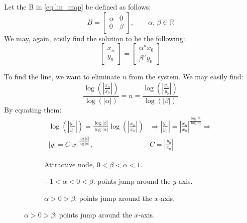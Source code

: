\begin{example}
    Let the B in \autoref{eq:lin_map} be defined as follows:
    \begin{equation*}
        B=\begin{bmatrix}
           \alpha & 0 \\ 0 & \beta 
        \end{bmatrix},\qquad \alpha,\,\beta\in\mathbb{R}
    \end{equation*}
    We may, again, easily find the solution to be the following: \begin{equation*}
        \begin{bmatrix}
            x_n \\ y_n
        \end{bmatrix}=\begin{bmatrix}
            \alpha^n x_0 \\ \beta^n y_0
        \end{bmatrix}
    \end{equation*}

    To find the line, we want to eliminate $n$ from the system. We may easily find: \begin{equation*}
        \frac{\log\left(\left|\frac{x_n}{x_0}\right|\right)}{\log(|\alpha|)}=n=\frac{\log\left(\left|\frac{y_n}{y_0}\right|\right)}{\log(|\beta|)}
    \end{equation*}
    By equating them: \begin{align*}
        \log\left(\left|\frac{y_n}{y_0}\right|\right)=\frac{\log|\beta|}{\log|\alpha|}\log\left(\left|\frac{x_n}{x_0}\right|\right)&\Rightarrow\left|\frac{y_n}{y_0}\right|=\left|\frac{x_n}{x_0}\right|^{\frac{\log|\beta|}{\log|\alpha|}}\Rightarrow \\
        |y|=C|x|^{\frac{\log|\beta|}{\log|\alpha|}},\qquad& C=\left|\frac{y_0}{x_0}\right|
    \end{align*}

    \begin{figure}[ht]
    \centering
    \begin{subfigure}[t]{0.32\textwidth}
        \centering
        \caption{Attractive node, $0<\beta<\alpha<1$.}
    \end{subfigure}\hfill
    \begin{subfigure}[t]{0.32\textwidth}
        \centering
        \caption{$-1<\alpha<0<\beta$: points jump around the $y$-axis.}
    \end{subfigure}\hfill
    \begin{subfigure}[t]{0.32\textwidth}
        \centering
        \caption{$\alpha>0>\beta$: points jump around the $x$-axis.}
    \end{subfigure}


\end{figure}
\end{example}
